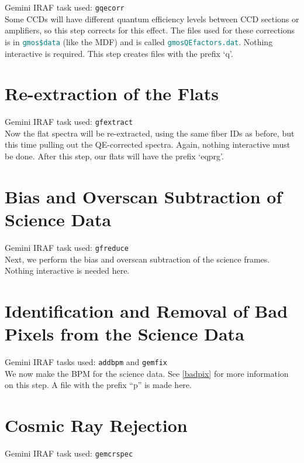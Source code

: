 \documentclass[12pt]{report}
\newcommand{\ty}[1]{\textcolor{teal}{\texttt{#1}}}
\begin{document}
\noindent Gemini IRAF task used: \texttt{gqecorr}\\

\noindent Some CCDs will have different quantum efficiency levels between CCD sections or amplifiers, so this step corrects for this effect. The files used for these corrections is in \ty{gmos\$data} (like the MDF) and is called \ty{gmosQEfactors.dat}. Nothing interactive is required. This step creates files with the prefix `q'.

\section{Re-extraction of the Flats}

\noindent Gemini IRAF task used: \texttt{gfextract}\\

\noindent Now the flat spectra will be re-extracted, using the same fiber IDs as before, but this time pulling out the QE-corrected spectra. Again, nothing interactive must be done. After this step, our flats will have the prefix `eqprg'.

\section{Bias and Overscan Subtraction of Science Data}

\noindent Gemini IRAF task used: \texttt{gfreduce}\\

\noindent Next, we perform the bias and overscan subtraction of the science frames. Nothing interactive is needed here.

\section{Identification and Removal of Bad Pixels from the Science Data}

\noindent Gemini IRAF tasks used: \texttt{addbpm} and \texttt{gemfix}\\

\noindent We now make the BPM for the science data. See \autoref{badpix} for more information on this step. A file with the prefix ``p'' is made here.

\section{Cosmic Ray Rejection}

\noindent Gemini IRAF task used: \texttt{gemcrspec}\\
\end{document}
